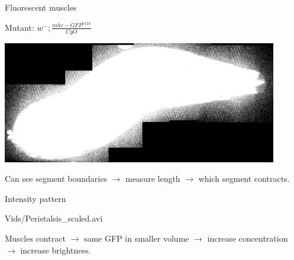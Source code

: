 \documentclass{beamer}%
\begin{document}
\begin{frame}{Fluorescent muscles}
%
 \begin{center}
 Mutant: $w^-; \frac{mhc-GFP^{0110}}{CyO}$ 

 \includegraphics[width=12cm]{Figs/LarvaStitchScaled.png}
 \end{center}

 \vp Can see segment boundaries $\to$ measure length $\to$ which segment contracts.
%
\end{frame}


\begin{frame}{Intensity pattern}
%
 \begin{center}
 {Vids/Peristalsis_scaled.avi}
 \end{center}

 Muscles contract $\rightarrow$ same GFP in smaller volume $\rightarrow$ increase
 concentration $\rightarrow$ increase brightness.

%
\end{frame}
\end{document}
